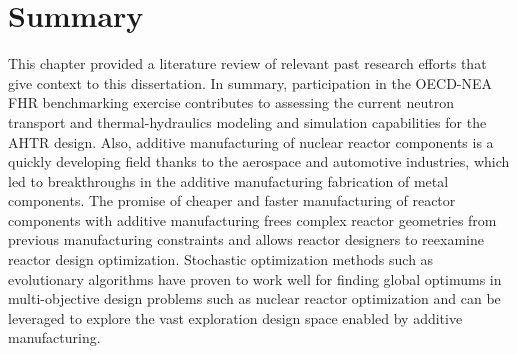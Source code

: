 \section{Summary}
This chapter provided a literature review of relevant past research 
efforts that give context to this dissertation. 
In summary, participation in the OECD-NEA FHR benchmarking exercise contributes 
to assessing the current neutron transport and thermal-hydraulics 
modeling and simulation capabilities for the \gls{AHTR} design.
Also, additive manufacturing of nuclear reactor components is a quickly 
developing field thanks to the aerospace and automotive industries, which led to 
breakthroughs in the additive manufacturing fabrication of metal components. 
The promise of cheaper and faster manufacturing of reactor components with 
additive manufacturing frees complex reactor geometries from previous 
manufacturing constraints and allows reactor designers to reexamine reactor 
design optimization.  
Stochastic optimization methods such as evolutionary algorithms have proven to 
work well for finding global optimums in multi-objective design problems such as 
nuclear reactor optimization and can be leveraged to explore the vast exploration 
design space enabled by additive manufacturing.

